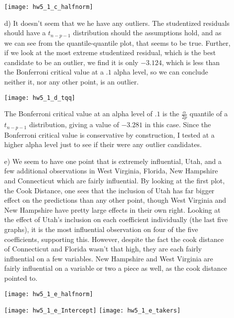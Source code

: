 \documentclass[11pt]{article}
\theoremstyle{definition}
\begin{document}
\begin{itemize}
\begin{itemize}
                \begin{center}
                    \texttt{[image: hw5\_1\_c\_halfnorm]} 
                \end{center}
            \item[d)]
                It doesn't seem that we he have any outliers. The studentized residuals should have a $t_{n-p-1}$ distribution should the assumptions hold, and as we can see from the quantile-quantile plot, that seems to be true. Further, if we look at the most extreme studentized residual, which is the best candidate to be an outlier, we find it is only $-3.124$, which is less than the Bonferroni critical value at a $.1$ alpha level, so we can conclude neither it, nor any other point, is an outlier. 
                \smallskip
                \begin{center}
                    \texttt{[image: hw5\_1\_d\_tqq]} 
                \end{center}
                The Bonferroni critical value at an alpha level of $.1$ is the \(\frac{\alpha}{2p}\) quantile of a $t_{n-p-1}$ distribution, giving a value of $-3.281$ in this case. Since the Bonferroni critical value is conservative by construction, I tested at a higher alpha level just to see if their were any outlier candidates.
            \item[e)]
                We seem to have one point that is extremely influential, Utah, and a few additional observations in West Virginia, Florida, New Hampshire and Connecticut which are fairly influential. By looking at the first plot, the Cook Distance, one sees that the inclusion of Utah has far bigger effect on the predictions than any other point, though West Virginia and New Hampshire have pretty large effects in their own right. Looking at the effect of Utah's inclusion on each coefficient individually (the last five graphs), it is the most influential observation on four of the five coefficients, supporting this. However, despite the fact the cook distance of Connecticut and Florida wasn't that high, they are each fairly influential on a few variables. New Hampshire and West Virginia are fairly influential on a variable or two a piece as well, as the cook distance pointed to.
                \begin{center}
                    \texttt{[image: hw5\_1\_e\_halfnorm]} 
                \end{center}
                \texttt{[image: hw5\_1\_e\_Intercept]}
                \texttt{[image: hw5\_1\_e\_takers]} \\

\end{itemize}
\end{itemize}
\end{document}

